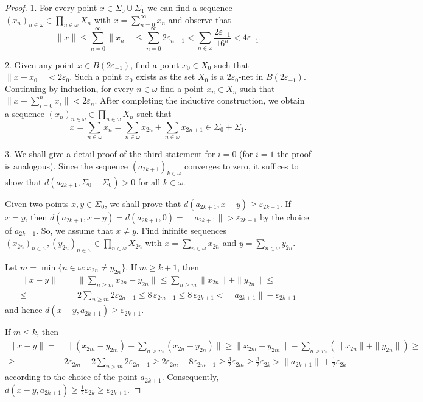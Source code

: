 \documentclass[11pt]{amsart}
\begin{document}
\begin{proof}
1. For every point $x\in \Sigma_0\cup\Sigma_1$ we can find a sequence $(x_n)_{n\in{\omega}}\in\prod_{n\in{\omega}}X_n$ with $x=\sum_{n=0}^\infty x_n$ and observe that $$\|x\|\le\sum_{n=0}^\infty\|x_n\|\le\sum_{n=0}^\infty 2{\varepsilon}_{n-1}< \sum_{n\in{\omega}}\frac{2{\varepsilon}_{-1}}{16^{n}}<4{\varepsilon}_{-1}.$$
\smallskip

2. Given any point $x\in B(2{\varepsilon}_{-1})$, find a point $x_0\in X_0$ such that $\|x-x_0\|<2{\varepsilon}_0$. Such a point $x_0$ exists as the set $X_0$ is a $2{\varepsilon}_0$-net in $B(2{\varepsilon}_{-1})$. Continuing by induction, for every $n\in{\omega}$ find a point $x_n\in X_n$ such that  $\|x-\sum_{i=0}^nx_i\|<2{\varepsilon}_n$. After completing the inductive construction, we obtain a sequence $(x_n)_{n\in{\omega}}\in\prod_{n\in{\omega}}X_n$ such that  $$x=\sum_{n\in{\omega}}x_n=\sum_{n\in{\omega}}x_{2n}+\sum_{n\in{\omega}}x_{2n+1}\in \Sigma_0+\Sigma_1.$$
\smallskip

3. We shall give a detail proof of the third statement for $i=0$ (for $i=1$ the proof is analogous).  Since the sequence $(a_{2k+1})_{k\in{\omega}}$ converges to zero, it suffices to show that $d(a_{2k+1},\Sigma_0-\Sigma_0)>0$ for all $k\in{\omega}$.

Given two points $x,y\in\Sigma_0$, we shall prove that $d(a_{2k+1},x-y)\ge {\varepsilon}_{2k+1}$. If $x=y$, then $d(a_{2k+1},x-y)=d(a_{2k+1},0)=\|a_{2k+1}\|> {\varepsilon}_{2k+1}$ by the choice of $a_{2k+1}$. So, we assume that $x\ne y$. Find infinite
sequences
$(x_{2n})_{n\in{\omega}},(y_{2n})_{n\in{\omega}}\in\prod_{n\in{\omega}}X_{2n}$ with
$x=\sum_{n\in{\omega}}x_{2n}$ and $y=\sum_{n\in{\omega}}y_{2n}$.

Let $m=\min\{n\in{\omega}:x_{2n}\ne y_{2n}\}$. If $m\ge k+1$, then
$$
\begin{aligned}
\|x-y\|=&\,\|\sum_{n\ge m}x_{2n}-y_{2n}\|\le\sum_{n\ge m}\|x_{2n}\|+\|y_{2n}\|\le\\
\le&\,2\sum_{n\ge m}2{\varepsilon}_{2n-1}\le
8\,{\varepsilon}_{2m-1}\le 8\,{\varepsilon}_{2k+1}<\|a_{2k+1}\|-{\varepsilon}_{2k+1}
\end{aligned}$$ and hence $d(x-y,a_{2k+1})\ge{\varepsilon}_{2k+1}$.

If $m\le k$, then
$$
\begin{aligned}
\|x-y\|=&\,\|(x_{2m}-y_{2m})+\sum_{n>m}(x_{2n}-y_{2n})\|\ge \|x_{2m}-y_{2m}\|-\sum_{n>m}(\|x_{2n}\|+\|y_{2n}\|)\ge\\
\ge&2{\varepsilon}_{2m}-2\sum_{n>m}2{\varepsilon}_{2n-1} \ge 2{\varepsilon}_{2m}-8{\varepsilon}_{2m+1}\ge \frac32{\varepsilon}_{2m}\ge \frac32{\varepsilon}_{2k}>\|a_{2k+1}\|+\frac12{\varepsilon}_{2k}
\end{aligned}$$ according to the choice of the point $a_{2k+1}$. Consequently, $d(x-y,a_{2k+1})\ge\frac12{\varepsilon}_{2k}\ge {\varepsilon}_{2k+1}$.
\end{proof}
\end{document}
